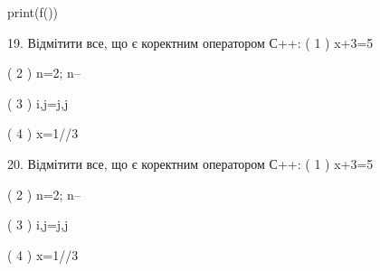 \documentclass[11pt]{article}
\begin{document}
print(f())

19. Відмітити все, що є коректним оператором С++:
( 1 ) x+3=5

( 2 ) n=2; n--

( 3 ) i,j=j,j

( 4 ) x=1//3

20. Відмітити все, що є коректним оператором С++:
( 1 ) x+3=5

( 2 ) n=2; n--

( 3 ) i,j=j,j

( 4 ) x=1//3





















\newpage
\end{document}
